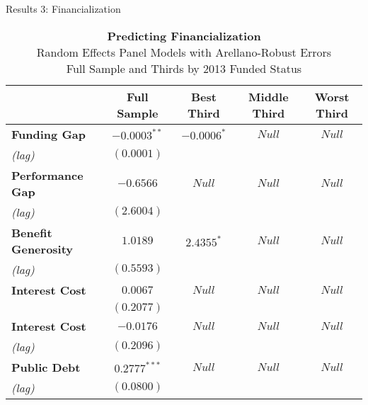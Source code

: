 \documentclass{beamer}
\begin{document}
\begin{frame}{\textmd{Results 3: Financialization}}
\vspace*{-1.5mm}
\begin{table}
\begin{tiny}
\caption*{\textbf{Predicting Financialization}\\\tiny{Random Effects Panel Models with Arellano-Robust Errors} \\ Full Sample and Thirds by 2013 Funded Status} 
\begin{center}
\begin{tabular}{l c c c c }
\hline
 & \textbf{Full Sample} & Best Third & Middle Third & Worst Third \\
\hline
\textbf{Funding Gap} & $\mathbf{-0.0003^{**}}$   & $-0.0006^{*}$   & \color{gray}$Null$         & \color{gray}$Null$  \\ 
\hspace*{0.25cm} \emph{(lag)} & $(0.0001)$       &  & &        \\ [0.4ex]
\textbf{Performance Gap}    & $-0.6566$        & \color{gray}$Null$         & \color{gray}$Null$         & \color{gray}$Null$           \\
\hspace*{0.25cm} \emph{(lag)}& $(2.6004)$       &  & &         \\[0.4ex]
\textbf{Benefit Generosity}    & $1.0189$ 		& $2.4355^{*}$    & \color{gray}$Null$         & \color{gray}$Null$           \\
\hspace*{0.25cm} \emph{(lag)}& $(0.5593)$       &  & &        \\[0.4ex]
\textbf{Interest Cost}            & $0.0067$         & \color{gray}$Null$        & \color{gray}$Null$   & \color{gray}$Null$   \\
                    & $(0.2077)$       &  & &         \\[0.4ex]
\textbf{Interest Cost}  & $-0.0176$        & \color{gray}$Null$         & \color{gray}$Null$         & \color{gray}$Null$          \\
\hspace*{0.25cm} \emph{(lag)} & $(0.2096)$       & & &         \\[0.4ex]
\textbf{Public Debt}     & $\mathbf{0.2777^{***}}$   & \color{gray}$Null$         & \color{gray}$Null$  & \color{gray}$Null$           \\
\hspace*{0.25cm} \emph{(lag)} & $(0.0800)$       &  & &     \\[0.4ex]

\end{tabular}
\end{center}
\end{tiny}
\end{table}
\end{frame}
\end{document}
